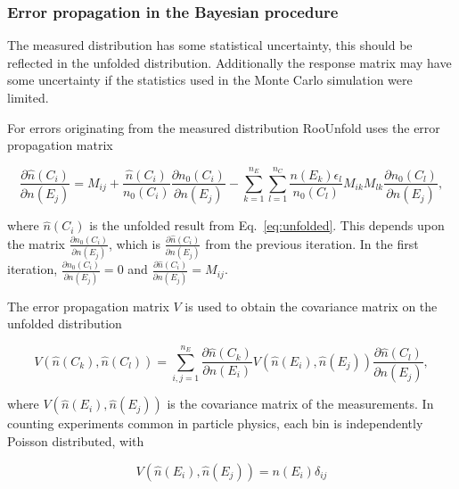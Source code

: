  \subsubsection*{Error propagation in the Bayesian procedure }
 The measured distribution has some statistical uncertainty, this should be reflected in the unfolded distribution. Additionally the response matrix may have some uncertainty if the statistics used in the Monte Carlo simulation were limited. 
 
For errors originating from the measured distribution RooUnfold uses the error propagation matrix 

\begin{equation}
\frac{\partial \hat n\left(C_i\right)}{\partial n\left(E_j\right)} = M_{ij} + \frac{\hat n\left(C_i\right)}{n_0\left(C_i\right)}\frac{\partial n_0\left(C_i\right) }{\partial n\left(E_j\right) } - \sum_{k=1}^{n_E}\sum_{l=1}^{n_C} \frac{n\left(E_k\right) \epsilon_l}{n_0\left(C_l\right)} M_{ik} M_{lk} \frac{\partial n_0 \left(C_l\right)}{\partial n\left(E_j\right)},
\end{equation} 
 
 where $\hat n \left(C_i\right)$ is the unfolded result from Eq.~\ref{eq:unfolded}. This depends upon the matrix $\frac{\partial n_0\left(C_i\right)}{\partial n\left(E_j\right) }$, which is $\frac{\partial \hat n\left(C_i\right) }{\partial n\left(E_j\right) }$ from the previous iteration. In the first iteration, $\frac{\partial n_0\left(C_i\right) }{\partial n\left(E_j\right) }=0$ and $\frac{\partial \hat n\left(C_i\right) }{\partial n\left(E_j\right) } = M_{ij}$.
 
 The error propagation matrix $V$ is used to obtain the covariance matrix on the unfolded distribution 
 
 \begin{equation}
 V\left(\hat n\left(C_k\right), \hat n\left(C_l\right)\right) = \sum_{i,j=1}^{n_E} \frac{\partial \hat n\left(C_k\right) }{\partial n\left(E_i\right) }  V\left(\hat n\left(E_i\right), \hat n\left(E_j\right)\right)  \frac{\partial \hat n\left(C_l\right) }{\partial n\left(E_j\right) },
 \end{equation}
 
 where $V\left(\hat n\left(E_i\right), \hat n\left(E_j\right)\right)$ is the covariance matrix of the measurements. In counting experiments common in particle physics, each bin is independently Poisson distributed, with
 
 \begin{equation}
 V\left(\hat n\left(E_i\right), \hat n\left(E_j\right)\right) = n\left(E_i\right) \delta_{ij}
 \end{equation}
 
